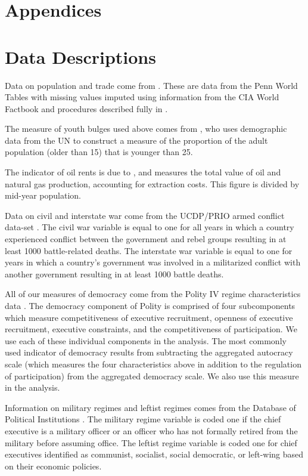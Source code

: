 \documentclass[11pt]{article}
\begin{document}
\appendix
\section*{Appendices}

\section{Data Descriptions}

Data on population and trade come from \citet{gleditsch2002expanded}. These are data from the Penn World Tables \citep{summers1991penn} with missing values imputed using information from the CIA World Factbook and procedures described fully in \citet{gleditsch2002expanded}. 

The measure of youth bulges used above comes from \citet{Urdal2006}, who uses demographic data from the UN to construct a measure of the proportion of the adult population (older than 15) that is younger than 25.

The indicator of oil rents is due to \citet{Ross2006}, and measures the total value of oil and natural gas production, accounting for extraction costs. This figure is divided by mid-year population. 

Data on civil and interstate war come from the UCDP/PRIO armed conflict data-set \citep{ThemnerWallensteen2012}. The civil war variable is equal to one for all years in which a country experienced conflict between the government and rebel groups resulting in at least 1000 battle-related deaths. The interstate war variable is equal to one for years in which a country's government was involved in a militarized conflict with another government resulting in at least 1000 battle deaths.

All of our measures of democracy come from the Polity IV regime characteristics data \citep{MarshallJaggers2009}. The democracy component of Polity is comprised of four subcomponents which measure competitiveness of executive recruitment, openness of executive recruitment, executive constraints, and the competitiveness of participation. We use each of these individual components in the analysis. The most commonly used indicator of democracy results from subtracting the aggregated autocracy scale (which measures the four characteristics above in addition to the regulation of participation) from the aggregated democracy scale. We also use this measure in the analysis.  

Information on military regimes and leftist regimes comes from the Database of Political Institutions \citep{beck2001new}. The military regime variable is coded one if the chief executive is a military officer or an officer who has not formally retired from the military before assuming office. The leftist regime variable is coded one for chief executives identified as communist, socialist, social democratic, or left-wing based on their economic policies. 
\end{document}
